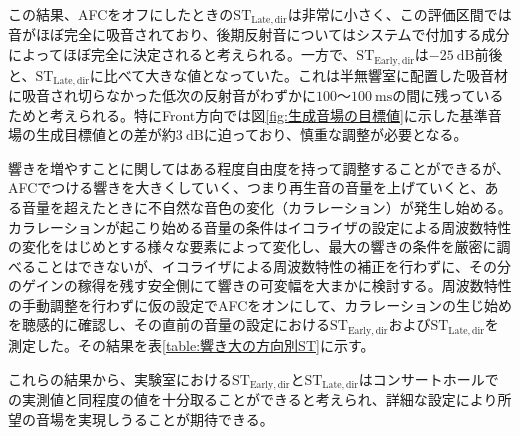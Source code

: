 \documentclass[11pt,a4j]{jreport}
\begin{document}
この結果、AFCをオフにしたときの$\mathrm{ST_{Late,dir}}$は非常に小さく、この評価区間では音がほぼ完全に吸音されており、後期反射音についてはシステムで付加する成分によってほぼ完全に決定されると考えられる。一方で、$\mathrm{ST_{Early,dir}}$は$\SI{-25}{\dB}$前後と、$\mathrm{ST_{Late,dir}}$に比べて大きな値となっていた。これは半無響室に配置した吸音材に吸音され切らなかった低次の反射音がわずかに$100$〜$\SI{100}{\ms}$の間に残っているためと考えられる。特にFront方向では図\ref{fig:生成音場の目標値}に示した基準音場の生成目標値との差が約$\SI{3}{\dB}$に迫っており、慎重な調整が必要となる。

響きを増やすことに関してはある程度自由度を持って調整することができるが、AFCでつける響きを大きくしていく、つまり再生音の音量を上げていくと、ある音量を超えたときに不自然な音色の変化（カラレーション）が発生し始める。カラレーションが起こり始める音量の条件はイコライザの設定による周波数特性の変化をはじめとする様々な要素によって変化し、最大の響きの条件を厳密に調べることはできないが、イコライザによる周波数特性の補正を行わずに、その分のゲインの稼得を残す安全側にて響きの可変幅を大まかに検討する。周波数特性の手動調整を行わずに仮の設定でAFCをオンにして、カラレーションの生じ始めを聴感的に確認し、その直前の音量の設定における$\mathrm{ST_{Early,dir}}$および$\mathrm{ST_{Late,dir}}$を測定した。その結果を表\ref{table:響き大の方向別ST}に示す。

これらの結果から、実験室における$\mathrm{ST_{Early,dir}}$と$\mathrm{ST_{Late,dir}}$はコンサートホールでの実測値と同程度の値を十分取ることができると考えられ、詳細な設定により所望の音場を実現しうることが期待できる。
\end{document}

